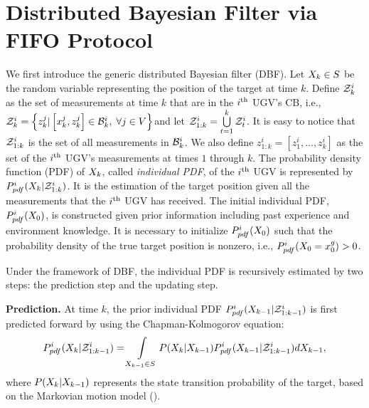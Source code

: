 \section{Distributed Bayesian Filter via FIFO Protocol}\label{sec:\proto-dbf}
	We first introduce the generic distributed Bayesian filter (DBF).
	Let $X_k\in S$ be the random variable representing the position of the target at time $k$.
	Define $\mathcal{Z}^i_k$ as the set of measurements at time $k$ that are in the $i^\text{th}$ UGV's CB, i.e., \small$\mathcal{Z}^i_k=\left\lbrace z^j_k| \left[x^j_k,z^j_k\right]\in \mathcal{B}^i_k,\; \forall j\in V\right\rbrace$\normalsize and let $\mathcal{Z}^i_{1:k} = \bigcup\limits_{t=1}^k \mathcal{Z}^i_t$. 
	\textcolor{\revcol}{It is easy to notice that $\mathcal{Z}^i_{1:k}$ is the set of all measurements in $\mathcal{B}^i_k$.}
	We also define $z^i_{1:k}=\left[z^i_1,\dots,z^i_k\right]$ as the set of the $i^\text{th}$ UGV's measurements at times $1$ through $k$.
	The probability density function (PDF) of $X_k$, called \textit{individual PDF}, of the $i^\text{th}$ UGV is represented by
	$P^i_{pdf}(X_{k}|\mathcal{Z}^i_{1:k})$.
	It is the estimation of the target position given all the measurements that the $i^\text{th}$ UGV has received.	
	The initial individual PDF, $P^i_{pdf}(X_0)$, is constructed given prior information including past experience and environment knowledge. 
	It is necessary to initialize $P^i_{pdf}(X_0)$ such that the probability density of the true target position is nonzero, i.e., $P^i_{pdf}(X_0=x^g_0)> 0$.
	
	Under the framework of DBF, the individual PDF is recursively estimated by two steps: the prediction step and the updating step. 
	
	\textbf{Prediction.}
	At time $k$, the prior individual PDF $P^i_{pdf}(X_{k-1}|\mathcal{Z}^i_{1:k-1})$ is first predicted forward by using the Chapman-Kolmogorov equation:
	\small
	\begin{equation}\label{eqn:bayes_pred}
	P^i_{pdf}(X_k|\mathcal{Z}^i_{1:k-1})
	=\int\limits_{X_{k-1}\in S} P(X_k|X_{k-1})P^i_{pdf}(X_{k-1}|\mathcal{Z}^i_{1:k-1})dX_{k-1},
	\end{equation}\normalsize
	where $P(X_k|X_{k-1})$ represents the state transition probability of the target, based on the Markovian motion model (). 
	
